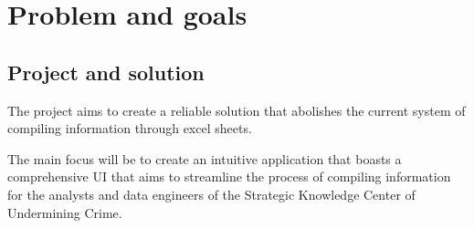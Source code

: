\section{Problem and goals}
\label{sec:Problem-and-goals}

\subsection{Project and solution}
\label{subsec:Project-or-Solution}

The project aims to create a reliable solution that abolishes the current system of compiling information through excel sheets. 

The main focus will be to create an intuitive application that boasts a comprehensive UI that aims to streamline the process of compiling information for the analysts and data engineers of the Strategic Knowledge Center of Undermining Crime.